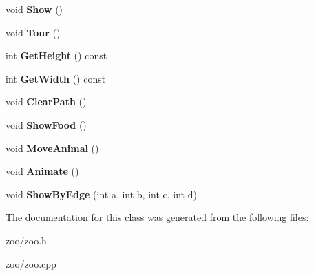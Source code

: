 \begin{DoxyCompactItemize}
\item 
void {\bfseries Show} ()\hypertarget{classZoo_ab76864623186f5a184b1759dbc0075be}{}\label{classZoo_ab76864623186f5a184b1759dbc0075be}

\item 
void {\bfseries Tour} ()\hypertarget{classZoo_a49fcd39d8c5b581c53207cc53db60aab}{}\label{classZoo_a49fcd39d8c5b581c53207cc53db60aab}

\item 
int {\bfseries Get\+Height} () const \hypertarget{classZoo_a3cdf56966accd462a353d0016af9d593}{}\label{classZoo_a3cdf56966accd462a353d0016af9d593}

\item 
int {\bfseries Get\+Width} () const \hypertarget{classZoo_a15686b55e0d2c422b6fa231c834c4870}{}\label{classZoo_a15686b55e0d2c422b6fa231c834c4870}

\item 
void {\bfseries Clear\+Path} ()\hypertarget{classZoo_a1d507aa36fb6db248a46238dff152fc7}{}\label{classZoo_a1d507aa36fb6db248a46238dff152fc7}

\item 
void {\bfseries Show\+Food} ()\hypertarget{classZoo_ad3424ac48cc5bba55a11b410cbb29040}{}\label{classZoo_ad3424ac48cc5bba55a11b410cbb29040}

\item 
void {\bfseries Move\+Animal} ()\hypertarget{classZoo_af393e04cb107ead6ddf33241ece15c47}{}\label{classZoo_af393e04cb107ead6ddf33241ece15c47}

\item 
void {\bfseries Animate} ()\hypertarget{classZoo_aac14b77f4aa847efd439d98583b4cc1b}{}\label{classZoo_aac14b77f4aa847efd439d98583b4cc1b}

\item 
void {\bfseries Show\+By\+Edge} (int a, int b, int c, int d)\hypertarget{classZoo_a72d9ece8961fd334ddcb10fd02f19275}{}\label{classZoo_a72d9ece8961fd334ddcb10fd02f19275}

\end{DoxyCompactItemize}


The documentation for this class was generated from the following files\+:\begin{DoxyCompactItemize}
\item 
zoo/zoo.\+h\item 
zoo/zoo.\+cpp\end{DoxyCompactItemize}
